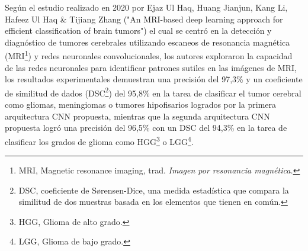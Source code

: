 \documentclass[12pt,twoside,titlepage]{ingenius}
\begin{document}
\begin{multicols}{2}
Según el estudio realizado en 2020 por Ejaz Ul Haq, Huang Jianjun, Kang Li, Hafeez Ul Haq \& Tijiang Zhang ("An MRI-based deep learning approach for efficient classification of brain tumors") \cite{17} el cual se centró en la detección y diagnóstico de tumores cerebrales utilizando escaneos de resonancia magnética (MRI\footnote{MRI, Magnetic resonance imaging, trad. \textit{Imagen por resonancia magnética.}}) y redes neuronales convolucionales, los autores exploraron la capacidad de las redes neuronales para identificar patrones sutiles en las imágenes de MRI, los resultados experimentales demuestran una precisión del 97,3\% y un coeficiente de similitud de dados (DSC\footnote{DSC, coeficiente de Sørensen-Dice, una medida estadística que compara la similitud de dos muestras basada en los elementos que tienen en común.}) del 95,8\% en la tarea de clasificar el tumor cerebral como gliomas, meningiomas o tumores hipofisarios logrados por la primera arquitectura CNN propuesta, mientras que la segunda arquitectura CNN propuesta logró una precisión del 96,5\% con un DSC del 94,3\% en la tarea de clasificar los grados de glioma como HGG\footnote{HGG, Glioma de alto grado.}  o LGG\footnote{LGG, Glioma de bajo grado.}. \\


\end{multicols}
\end{document}

